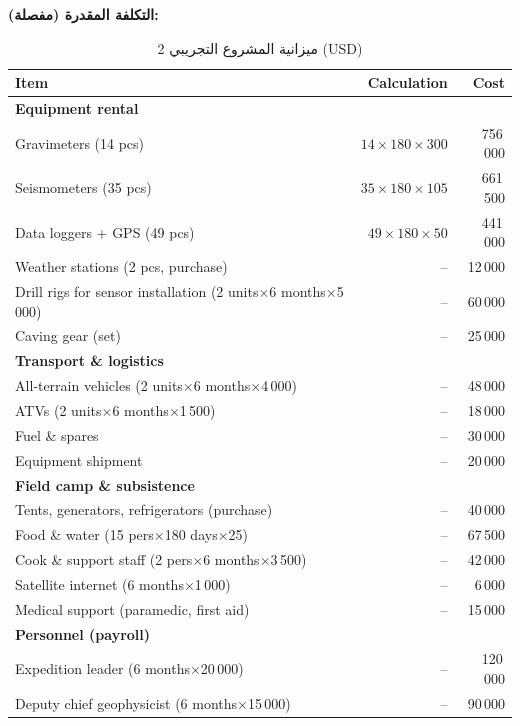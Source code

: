 \documentclass[12pt,a4paper]{article}
\theoremstyle{remark}
\begin{document}
	\textbf{التكلفة المقدرة (مفصلة):}
	\begin{otherlanguage}{english}
		\begin{table}[htbp]
			\centering
			\caption{ميزانية المشروع التجريبي 2 (USD)}
			\label{tab:budget-karst}
			\small
			\begin{tabular}{lrr}
				\toprule
				\textbf{Item} & \textbf{Calculation} & \textbf{Cost} \\
				\midrule
				\multicolumn{3}{l}{\textbf{Equipment rental}} \\
				Gravimeters (14 pcs) & \(14\times180\times300\) & 756\,000 \\
				Seismometers (35 pcs) & \(35\times180\times105\) & 661\,500 \\
				Data loggers + GPS (49 pcs) & \(49\times180\times50\) & 441\,000 \\
				Weather stations (2 pcs, purchase) & – & 12\,000 \\
				Drill rigs for sensor installation (2 units\(\times\)6 months\(\times\)5\,000) & – & 60\,000 \\
				Caving gear (set) & – & 25\,000 \\
				\multicolumn{3}{l}{\textbf{Transport \& logistics}} \\
				All‑terrain vehicles (2 units\(\times\)6 months\(\times\)4\,000) & – & 48\,000 \\
				ATVs (2 units\(\times\)6 months\(\times\)1\,500) & – & 18\,000 \\
				Fuel \& spares & – & 30\,000 \\
				Equipment shipment & – & 20\,000 \\
				\multicolumn{3}{l}{\textbf{Field camp \& subsistence}} \\
				Tents, generators, refrigerators (purchase) & – & 40\,000 \\
				Food \& water (15 pers\(\times\)180 days\(\times\)25) & – & 67\,500 \\
				Cook \& support staff (2 pers\(\times\)6 months\(\times\)3\,500) & – & 42\,000 \\
				Satellite internet (6 months\(\times\)1\,000) & – & 6\,000 \\
				Medical support (paramedic, first aid) & – & 15\,000 \\
				\multicolumn{3}{l}{\textbf{Personnel (payroll)}} \\
				Expedition leader (6 months\(\times\)20\,000) & – & 120\,000 \\
				Deputy chief geophysicist (6 months\(\times\)15\,000) & – & 90\,000 \\

\end{tabular}
\end{table}
\end{otherlanguage}
\end{document}
